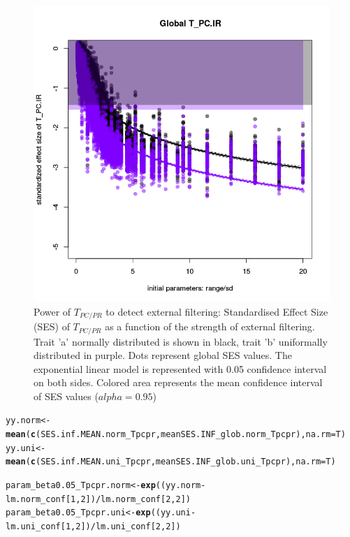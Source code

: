 \documentclass[12pt]{article}\usepackage[]{graphicx}\usepackage[]{color}
\makeatletter
\def\maxwidth{ %
  \ifdim\Gin@nat@width>\linewidth
    \linewidth
  \else
    \Gin@nat@width
  \fi
}
\newcommand{\hlnum}[1]{\textcolor[rgb]{0.686,0.059,0.569}{#1}}%
\newcommand{\hlopt}[1]{\textcolor[rgb]{0,0,0}{#1}}%
\newcommand{\hlstd}[1]{\textcolor[rgb]{0.345,0.345,0.345}{#1}}%
\newcommand{\hlkwb}[1]{\textcolor[rgb]{0.69,0.353,0.396}{#1}}%
\newcommand{\hlkwc}[1]{\textcolor[rgb]{0.333,0.667,0.333}{#1}}%
\newcommand{\hlkwd}[1]{\textcolor[rgb]{0.737,0.353,0.396}{\textbf{#1}}}%
\newenvironment{kframe}{%
 \def\at@end@of@kframe{}%
 \ifinner\ifhmode%
  \def\at@end@of@kframe{\end{minipage}}%
  \begin{minipage}{\columnwidth}%
 \fi\fi%
 \def\FrameCommand##1{\hskip\@totalleftmargin \hskip-\fboxsep
 \colorbox{shadecolor}{##1}\hskip-\fboxsep
     \hskip-\linewidth \hskip-\@totalleftmargin \hskip\columnwidth}%
 \MakeFramed {\advance\hsize-\width
   \@totalleftmargin\z@ \linewidth\hsize
   \@setminipage}}%
 {\par\unskip\endMakeFramed%
 \at@end@of@kframe}
\newenvironment{knitrout}{}{} %
\makeatother
\begin{document}
\begin{knitrout}
\begin{figure}
{\centering \includegraphics[width=\maxwidth]{figure/Ex_conc_plot2-1} 

}

\caption[Power of $T_{PC/PR}$ to detect external filtering]{Power of $T_{PC/PR}$ to detect external filtering: Standardised Effect Size (SES) of $T_{PC/PR}$ as a function of the strength of external filtering. Trait 'a' normally distributed is shown in black, trait 'b' uniformally distributed in purple. Dots represent global SES values. The exponential linear model is represented with 0.05 confidence interval on both sides. Colored area represents the mean confidence interval of SES values ($alpha = 0.95$)}\label{fig:Ex_conc_plot2}
\end{figure}


\end{knitrout}

\begin{knitrout}\small
{}\color{fgcolor}\begin{kframe}
\begin{alltt}
\hlstd{yy.norm} \hlkwb{<-} \hlkwd{mean}\hlstd{(}\hlkwd{c}\hlstd{(SES.inf.MEAN.norm_Tpcpr, meanSES.INF_glob.norm_Tpcpr),} \hlkwc{na.rm} \hlstd{= T)}
\hlstd{yy.uni} \hlkwb{<-} \hlkwd{mean}\hlstd{(}\hlkwd{c}\hlstd{(SES.inf.MEAN.uni_Tpcpr, meanSES.INF_glob.uni_Tpcpr),} \hlkwc{na.rm} \hlstd{= T)}

\hlstd{param_beta0.05_Tpcpr.norm} \hlkwb{<-} \hlkwd{exp}\hlstd{((yy.norm} \hlopt{-} \hlstd{lm.norm_conf [}\hlnum{1}\hlstd{,} \hlnum{2}\hlstd{])} \hlopt{/} \hlstd{lm.norm_conf[}\hlnum{2}\hlstd{,} \hlnum{2}\hlstd{])}
\hlstd{param_beta0.05_Tpcpr.uni} \hlkwb{<-} \hlkwd{exp}\hlstd{((yy.uni} \hlopt{-} \hlstd{lm.uni_conf [}\hlnum{1}\hlstd{,} \hlnum{2}\hlstd{])} \hlopt{/} \hlstd{lm.uni_conf[}\hlnum{2}\hlstd{,} \hlnum{2}\hlstd{])}
\end{alltt}
\end{kframe}
\end{knitrout}
\end{document}
